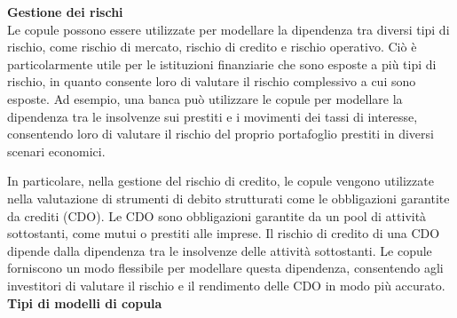 \documentclass[a4paper,12pt]{article}
\begin{document}
\noindent \textbf{Gestione dei rischi}\\

\noindent Le copule possono essere utilizzate per modellare la dipendenza tra diversi tipi di rischio, come rischio di mercato, rischio di credito e rischio operativo. Ciò è particolarmente utile per le istituzioni finanziarie che sono esposte a più tipi di rischio, in quanto consente loro di valutare il rischio complessivo a cui sono esposte. Ad esempio, una banca può utilizzare le copule per modellare la dipendenza tra le insolvenze sui prestiti e i movimenti dei tassi di interesse, consentendo loro di valutare il rischio del proprio portafoglio prestiti in diversi scenari economici.

\noindent In particolare, nella gestione del rischio di credito, le copule vengono utilizzate nella valutazione di strumenti di debito strutturati come le obbligazioni garantite da crediti (CDO). Le CDO sono obbligazioni garantite da un pool di attività sottostanti, come mutui o prestiti alle imprese. Il rischio di credito di una CDO dipende dalla dipendenza tra le insolvenze delle attività sottostanti. Le copule forniscono un modo flessibile per modellare questa dipendenza, consentendo agli investitori di valutare il rischio e il rendimento delle CDO in modo più accurato.\\
\newline
\textbf{Tipi di modelli di copula}\\
\end{document}
